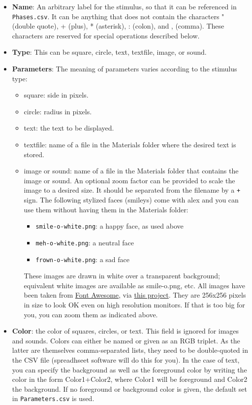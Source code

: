 \documentclass[11pt,]{article}
\begin{document}
\begin{itemize}
\item
  \textbf{Name}: An arbitrary label for the stimulus, so that it can be
  referenced in \texttt{Phases.csv}. It can be anything that does not
  contain the characters " (double quote), + (plus), * (asterisk), :
  (colon), and , (comma). These characters are reserved for special
  operations described below.
\item
  \textbf{Type}: This can be square, circle, text, textfile, image, or
  sound.
\item
  \textbf{Parameters}: The meaning of parameters varies according to the
  stimulus type:

  \begin{itemize}
  \item
    square: side in pixels.
  \item
    circle: radius in pixels.
  \item
    text: the text to be displayed.
  \item
    textfile: name of a file in the Materials folder where the desired
    text is stored.
  \item
    image or sound: name of a file in the Materials folder that contains
    the image or sound. An optional zoom factor can be provided to scale
    the image to a desired size. It should be separated from the
    filename by a \texttt{+} sign. The following stylized faces
    (smileys) come with alex and you can use them without having them in
    the Materials folder:

    \begin{itemize}
    \item
      \texttt{smile-o-white.png}: a happy face, as used above
    \item
      \texttt{meh-o-white.png}: a neutral face
    \item
      \texttt{frown-o-white.png}: a sad face
    \end{itemize}

    These images are drawn in white over a transparent background;
    equivalent white images are available as smile-o.png, etc. All
    images have been taken from
    \href{http://fortawesome.github.io/Font-Awesome}{Font Awesome}, via
    \href{https://github.com/encharm/Font-Awesome-SVG-PNG}{this
    project}. They are 256x256 pixels in size to look OK even on high
    resolution monitors. If that is too big for you, you can zoom them
    as indicated above.
  \end{itemize}
\item
  \textbf{Color}: the color of squares, circles, or text. This field is
  ignored for images and sounds. Colors can either be named or given as
  an RGB triplet. As the latter are themselves comma-separated lists,
  they need to be double-quoted in the CSV file (spreadhseet software
  will do this for you). In the case of text, you can specify the
  background as well as the foreground color by writing the color in the
  form Color1+Color2, where Color1 will be foreground and Color2 the
  background. If no foreground or background color is given, the default
  set in \texttt{Parameters.csv} is used.


\end{itemize}
\end{document}
